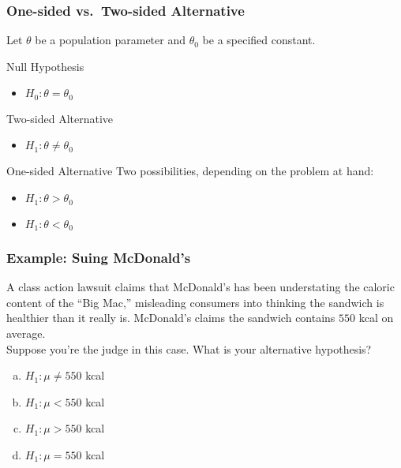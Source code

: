 \documentclass{beamer}
\begin{document}
\begin{frame}
\frametitle{One-sided vs.\ Two-sided Alternative}
\alert{Let $\theta$ be a population parameter and $\theta_0$ be a specified constant.}
\begin{block}
	{Null Hypothesis}
\begin{itemize}
	\item $H_0\colon \theta = \theta_0$
\end{itemize}\end{block}
	\begin{block}{Two-sided Alternative}
		\begin{itemize}
			\item $H_1\colon \theta \neq \theta_0$
		\end{itemize}
\end{block}
	\begin{block}{One-sided Alternative}
		Two possibilities, depending on the problem at hand:
		\begin{itemize}
			\item $H_1\colon \theta > \theta_0$
			\item $H_1\colon \theta < \theta_0$
		\end{itemize}
\end{block}
\end{frame}

\begin{frame}
\frametitle{Example: Suing McDonald's }

A class action lawsuit claims that McDonald's has been  understating the caloric content of the ``Big Mac,'' misleading consumers into thinking the sandwich is healthier than it really is. McDonald's claims the sandwich contains $550$ kcal on average. \\

\vspace{1em}
\alert{Suppose you're the judge in this case. What is your alternative hypothesis?}

	\begin{enumerate}[(a)]
		\item $H_1\colon \mu \neq 550$ kcal
		\item $H_1\colon \mu < 550$ kcal
		\item $H_1\colon \mu > 550$ kcal
		\item $H_1\colon \mu = 550$ kcal
\end{enumerate}
\end{frame}
\end{document}
